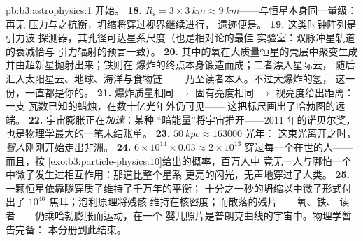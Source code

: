 \begin{solution}{pb:b3:astrophysics:1}
开始。
\textbf{18.} $R_{\text{s}} = 3\times\qty{3}{km} \approx
\qty{9}{km}$——与恒星本身同一量级：再无
压力与之抗衡，坍缩将穿过视界继续进行，
遗迹便是。
\textbf{19.} 这类时钟阵列是引力波
探测器，其孔径可达星系尺度（也是相对论的最佳
实验室：双脉冲星轨道的衰减恰与
引力辐射的预言一致）。
\textbf{20.} 其中的氧在大质量恒星的壳层中聚变生成
并由超新星抛射出来；铁则在
爆炸的终点本身锻造而成；二者漂入星际云，
随后汇入太阳星云、地球、海洋与食物链
——乃至读者本人。不过大爆炸的氢，
这一份，一直都是你的。
\textbf{21.} 爆炸质量相同 $\to$ 固有亮度相同
$\to$ 视亮度给出距离：一支
瓦数已知的蜡烛，在数十亿光年外仍可见——
这把标尺画出了哈勃图的远端。
\textbf{22.} 宇宙膨胀正在\emph{加速}：某种
“暗能量”将宇宙推开——2011 年的诺贝尔奖，
也是物理学最大的一笔未结账单。
\textbf{23.} $\qty{50}{kpc} \approx 163000$ 光年：
这束光离开之时，\emph{智人}刚刚开始走出非洲。
\textbf{24.} $6\times10^{14}\times0.03 \approx 2\times10^{13}$
穿过每一个在世的人——而且，按
\cref{exo:b3:particle-physics:10}给出的概率，百万人中
竟无一人与哪怕一个中微子发生过相互作用：那道比整个星系
更亮的闪光，无声地穿过了人类。
\textbf{25.} 一颗恒星依靠隧穿质子维持了千万年的平衡；
十分之一秒的坍缩以中微子形式付出了 $10^{46}$
焦耳；泡利原理将残骸
维持在核密度；而散落的残片——氧、铁、
读者——仍乘哈勃膨胀而运动，在一个
婴儿照片是普朗克曲线的宇宙中。物理学暂告完备：
本分册到此结束。
\end{solution}
